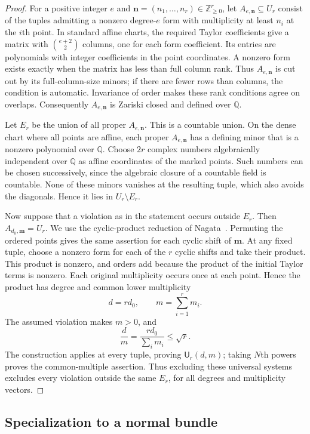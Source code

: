 \begin{proof}
For a positive integer $e$ and $\mathbf{n}=(n_1,\ldots,n_r)\in\mathbb{Z}_{\ge0}^r$, let $A_{e,\mathbf{n}}\subseteq U_r$ consist of the tuples admitting a nonzero degree-$e$ form with multiplicity at least $n_i$ at the $i$th point. In standard affine charts, the required Taylor coefficients give a matrix with $\binom{e+2}{2}$ columns, one for each form coefficient. Its entries are polynomials with integer coefficients in the point coordinates.  A nonzero form exists exactly when the matrix has less than full column rank.  Thus $A_{e,\mathbf{n}}$ is cut out by its full-column-size minors; if there are fewer rows than columns, the condition is automatic.  Invariance of order makes these rank conditions agree on overlaps.  Consequently $A_{e,\mathbf{n}}$ is Zariski closed and defined over $\mathbb{Q}$.

Let $E_r$ be the union of all proper $A_{e,\mathbf{n}}$.  This is a countable union.  On the dense chart where all points are affine, each proper $A_{e,\mathbf{n}}$ has a defining minor that is a nonzero polynomial over $\mathbb{Q}$.  Choose $2r$ complex numbers algebraically independent over $\mathbb{Q}$ as affine coordinates of the marked points.  Such numbers can be chosen successively, since the algebraic closure of a countable field is countable.  None of these minors vanishes at the resulting tuple, which also avoids the diagonals.  Hence it lies in $U_r\setminus E_r$.

Now suppose that a violation as in the statement occurs outside $E_r$. Then $A_{d_0,\mathbf{m}}=U_r$.  We use the cyclic-product reduction of Nagata~\cite{Nagata1965}. Permuting the ordered points gives the same assertion for each cyclic shift of $\mathbf{m}$.  At any fixed tuple, choose a nonzero form for each of the $r$ cyclic shifts and take their product.  This product is nonzero, and orders add because the product of the initial Taylor terms is nonzero.  Each original multiplicity occurs once at each point.  Hence the product has degree and common lower multiplicity
\[
 d=rd_0,
 \qquad
 m=\sum_{i=1}^r m_i.
\]
The assumed violation makes $m>0$, and
\[
 \frac d m
 =\frac{r d_0}{\sum_i m_i}
 \le\sqrt r.
\]
The construction applies at every tuple, proving $\mathsf U_r(d,m)$; taking $N$th powers proves the common-multiple assertion.  Thus excluding these universal systems excludes every violation outside the same $E_r$, for all degrees and multiplicity vectors.
\end{proof}

\subsection{Specialization to a normal bundle}

